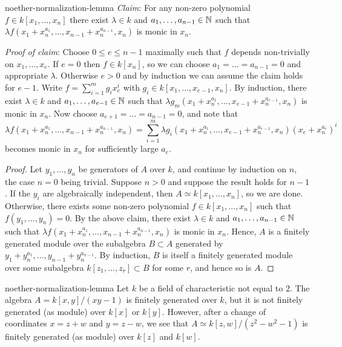 \begin{example}{noether-normalization-lemma}
    \textit{Claim}: For any non-zero polynomial $f \in k[x_1, \ldots, x_n]$ there exist $\lambda \in k$ and $a_1, \ldots, a_{n - 1} \in \mathbb{N}$ such that $\lambda f(x_1 + x_n^{a_1}, \ldots, x_{n - 1} + x_n^{a_{n - 1}}, x_n)$ is monic in $x_n$.
    
    \textit{Proof of claim}: Choose $0 \le e \le n - 1$ maximally such that $f$ depends non-trivially on $x_1, \ldots, x_e$. If $e = 0$ then $f \in k[x_n]$, so we can choose $a_1 = \ldots = a_{n - 1} = 0$ and appropriate $\lambda$. Otherwise $e > 0$ and by induction we can assume the claim holds for $e - 1$. Write $f = \sum_{i = 1}^{m} g_i x_e^i$ with $g_i \in k[x_1, \ldots, x_{e - 1}, x_n]$. By induction, there exist $\lambda \in k$ and $a_1, \ldots, a_{e - 1} \in \mathbb{N}$ such that $\lambda g_m(x_1 + x_n^{a_1}, \ldots, x_{e - 1} + x_n^{a_{e - 1}}, x_n)$ is monic in $x_n$. Now choose $a_{e + 1} = \ldots = a_{n - 1} = 0$, and note that
        \[ \lambda f(x_1 + x_n^{a_1}, \ldots, x_{n - 1} + x_n^{a_{n - 1}}, x_n) = \sum_{i = 1}^{m} \lambda g_i(x_1 + x_n^{a_1}, \ldots, x_{e - 1} + x_n^{a_{e - 1}}, x_n) (x_e + x_n^{a_e})^i \]
        becomes monic in $x_n$ for sufficiently large $a_e$.

    \begin{proof}
        Let $y_1, \ldots, y_n$ be generators of $A$ over $k$, and continue by induction on $n$, the case $n = 0$ being trivial. Suppose $n > 0$ and suppose the result holds for $n - 1$. If the $y_i$ are algebraically independent, then $A \simeq k[x_1, \ldots, x_n]$, so we are done. Otherwise, there exists some non-zero polynomial $f \in k[x_1, \ldots, x_n]$ such that $f(y_1, \ldots, y_n) = 0$. By the above claim, there exist $\lambda \in k$ and $a_1, \ldots, a_{n - 1} \in \mathbb{N}$ such that $\lambda f(x_1 + x_n^{a_1}, \ldots, x_{n - 1} + x_n^{a_{n - 1}}, x_n)$ is monic in $x_n$. Hence, $A$ is a finitely generated module over the subalgebra $B \subset A$ generated by $y_1 + y_n^{a_1}, \ldots, y_{n - 1} + y_n^{a_{n - 1}}$. By induction, $B$ is itself a finitely generated module over some subalgebra $k[z_1, \ldots, z_r] \subset B$ for some $r$, and hence so is $A$.
    \end{proof}
\end{example}

\begin{example}{noether-normalization-lemma}
    Let $k$ be a field of characteristic not equal to $2$. The algebra $A = k[x, y] / (xy - 1)$ is finitely generated over $k$, but it is not finitely generated (as module) over $k[x]$ or $k[y]$. However, after a change of coordinates $x = z + w$ and $y = z - w$, we see that $A \simeq k[z, w] / (z^2 - w^2 - 1)$ is finitely generated (as module) over $k[z]$ and $k[w]$.
\end{example}

